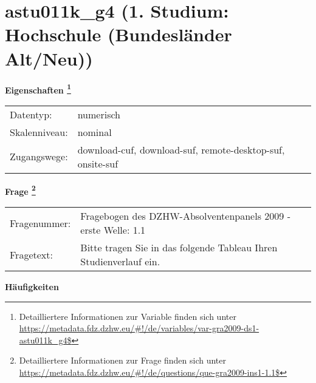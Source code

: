 
    \setcounter{footnote}{0}

    \vspace*{-1.8cm}
	\section{astu011k\_g4 (1. Studium: Hochschule (Bundesländer Alt/Neu))}
	\label{section:astu011k_g4}



    \vspace*{0.5cm}
    \noindent\textbf{Eigenschaften
	\footnote{Detailliertere Informationen zur Variable finden sich unter
		\url{https://metadata.fdz.dzhw.eu/\#!/de/variables/var-gra2009-ds1-astu011k_g4$}}}\\
	\begin{tabularx}{\hsize}{@{}lX}
	Datentyp: & numerisch \\
	Skalenniveau: & nominal \\
	Zugangswege: &
	  download-cuf, 
	  download-suf, 
	  remote-desktop-suf, 
	  onsite-suf
 \\
    \end{tabularx}



				\vspace*{0.5cm}
                \noindent\textbf{Frage
	                \footnote{Detailliertere Informationen zur Frage finden sich unter
		              \url{https://metadata.fdz.dzhw.eu/\#!/de/questions/que-gra2009-ins1-1.1$}}}\\
				\begin{tabularx}{\hsize}{@{}lX}
					Fragenummer: &
					  Fragebogen des DZHW-Absolventenpanels 2009 - erste Welle:
					  1.1
 \\
					Fragetext: & Bitte tragen Sie in das folgende Tableau Ihren Studienverlauf ein. \\
				\end{tabularx}





        		\vspace*{0.5cm}
                \noindent\textbf{Häufigkeiten}


